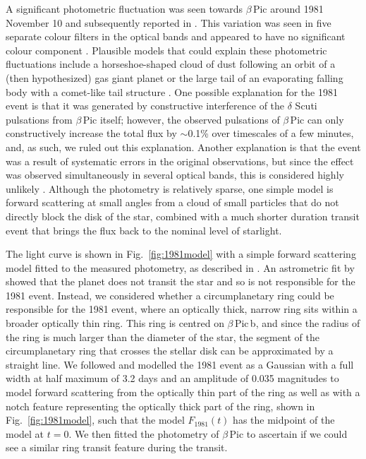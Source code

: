 \documentclass[longauth]{aa} %
\newcommand{\bpb}{$\beta$\,Pic\,b}
\newcommand{\bp}{$\beta$\,Pic}
\begin{document}
A significant photometric fluctuation was seen towards \bp{} around 1981 November 10 and subsequently reported in \citet{LecavelierdesEtangs95}.
%
This variation was seen in five separate colour filters in the optical bands and appeared to have no significant colour component \citep{Lamers97}.
%
Plausible models that could explain these photometric fluctuations include a horseshoe-shaped cloud of dust following an orbit of a (then hypothesized) gas giant planet \citep{LecavelierdesEtangs97} or the large tail of an evaporating falling body with a comet-like tail structure \citep{Lamers97}.
%
One possible explanation for the 1981 event is that it was generated by constructive interference of the $\delta$ Scuti pulsations from \bp{} itself; however, the observed pulsations of \bp{} can only constructively increase the total flux by $\sim$0.1\% over timescales of a few minutes, and, as such, we ruled out this explanation. Another explanation is that the event was a result of systematic errors in the original observations, but since the effect was observed simultaneously in several optical bands, this is considered highly unlikely \citep{LecavelierdesEtangs95}.
%
Although the photometry is relatively sparse, one simple model is forward scattering at small angles from a cloud of small particles that do not directly block the disk of the star, combined with a much shorter duration transit event that brings the flux back to the nominal level of starlight.

The light curve is shown in Fig.~\ref{fig:1981model} with a simple forward scattering model fitted to the measured photometry, as described in \citet{Lamers97}.
%
An astrometric fit by \citet{Wang16} showed that the planet does not transit the star and so is not responsible for the 1981 event.
%
Instead, we considered whether a circumplanetary ring could be responsible for the 1981 event, where an optically thick, narrow ring sits within a broader optically thin ring.
%
This ring is centred on \bpb{}, and since the radius of the ring is much larger than the diameter of the star, the segment of the circumplanetary ring that crosses the stellar disk can be approximated by a straight line.
%
We followed \citet{Lamers97} and modelled the 1981 event as a Gaussian with a full width at half maximum of 3.2 days and an amplitude of 0.035 magnitudes to model forward scattering from the optically thin part of the ring as well as with a notch feature representing the optically thick part of the ring, shown in Fig.~\ref{fig:1981model}, such that the model $F_{1981}(t)$ has the midpoint of the model at $t=0$.
%
We then fitted the photometry of \bp{} to ascertain if we could see a similar ring transit feature during the transit.
\end{document}
